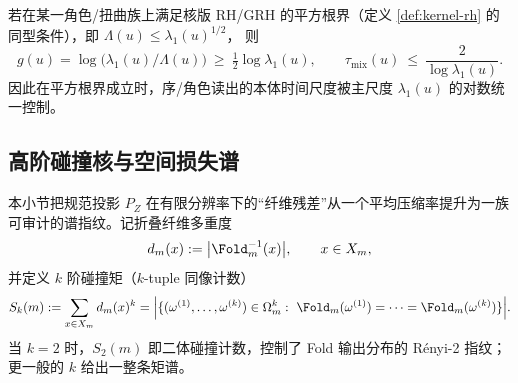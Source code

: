 \begin{corollary}[GRH-型平方根界 \texorpdfstring{$\Rightarrow$}{=>} 混合尺度的通用上界]\label{cor:pom-grh-mix-upper}
若在某一角色/扭曲族上满足核版 RH/GRH 的平方根界（定义 \ref{def:kernel-rh} 的同型条件），即
\(
\Lambda(u)\le \lambda_1(u)^{1/2}
\)，
则
\[
g(u)=\log\!\bigl(\lambda_1(u)/\Lambda(u)\bigr)\ \ge\ \tfrac12\log\lambda_1(u),
\qquad
\tau_{\mathrm{mix}}(u)\ \le\ \frac{2}{\log\lambda_1(u)}.
\]
因此在平方根界成立时，序/角色读出的本体时间尺度被主尺度 $\lambda_1(u)$ 的对数统一控制。
\end{corollary}

\subsection{高阶碰撞核与空间损失谱}\label{subsec:pom-higher-collision-spectrum}
本小节把规范投影 $P_Z$ 在有限分辨率下的“纤维残差”从一个平均压缩率提升为一族可审计的谱指纹。记折叠纤维多重度
$$
d_m(x):=\bigl|\Fold_m^{-1}(x)\bigr|,\qquad x\in X_m,
$$
并定义 $k$ 阶碰撞矩（$k$-tuple 同像计数）
$$
S_k(m):=\sum_{x\in X_m} d_m(x)^k
=\Bigl|\{(\omega^{(1)},\dots,\omega^{(k)})\in\Omega_m^k:\ \Fold_m(\omega^{(1)})=\cdots=\Fold_m(\omega^{(k)})\}\Bigr|.
$$
当 $k=2$ 时，$S_2(m)$ 即二体碰撞计数，控制了 Fold 输出分布的 Rényi-2 指纹；更一般的 $k$ 给出一整条矩谱。


